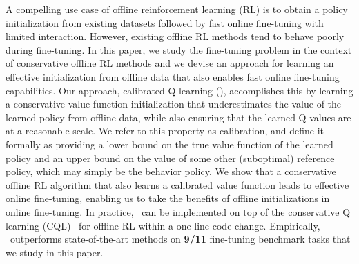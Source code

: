 \documentclass[../thesis.tex]{subfiles}
\begin{document}

A compelling use case of offline reinforcement learning (RL) is to obtain a policy initialization from existing datasets followed by fast online fine-tuning with limited interaction. However, existing offline RL methods tend to behave poorly during fine-tuning. In this paper, we study the fine-tuning problem in the context of conservative offline RL methods and we devise an approach for learning an effective initialization from offline data that also enables fast online fine-tuning capabilities. Our approach, calibrated Q-learning (\methodname), accomplishes this by learning a conservative value function initialization that underestimates the value of the learned policy from offline data, while also ensuring that the learned Q-values are at a reasonable scale. We refer to this property as calibration, and define it formally as providing a lower bound on the true value function of the learned policy and an upper bound on the value of some other (suboptimal) reference policy, which may simply be the behavior policy. We show that a conservative offline RL algorithm that also learns a calibrated value function leads to effective online fine-tuning, enabling us to take the benefits of offline initializations in online fine-tuning. In practice, \methodname\ can be implemented on top of the conservative Q learning (CQL)~\cite{kumar2020conservative} for offline RL within a one-line code change. Empirically, \methodname\ outperforms state-of-the-art methods on {\bf 9/11} fine-tuning benchmark tasks that we study in this paper.     









\end{document}
